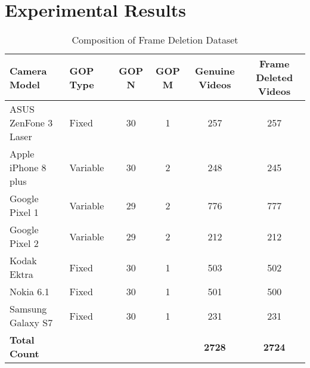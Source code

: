 \chapter{Experimental Results}

\begin{table}[htbp]
  \begin{adjustbox}{width=0.9\linewidth, center}
  \begin{tabu}{ l | l | c | c | c | c }
    \hline
    \rowfont{\bfseries} Camera Model & GOP Type & GOP N & GOP M & Genuine Videos & Frame Deleted Videos \\ \hline	
    ASUS ZenFone 3 Laser & Fixed & 30 & 1 & 257 & 257 \\
    Apple iPhone 8 plus & Variable & 30 & 2 & 248 & 245 \\
    Google Pixel 1 & Variable & 29 & 2 & 776 & 777 \\
    Google Pixel 2 & Variable & 29 & 2 & 212 & 212 \\
    Kodak Ektra & Fixed & 30 & 1 & 503 & 502 \\
    Nokia 6.1 & Fixed & 30 & 1 & 501 & 500 \\
    Samsung Galaxy S7 & Fixed & 30 & 1 & 231 & 231 \\ \hline
    \textbf{Total Count} &  &  &  & \textbf{2728} & \textbf{2724} \\ \hline
  \end{tabu}
  \end{adjustbox}
  \caption{Composition of Frame Deletion Dataset}
  \label{datasetComp}
\end{table}